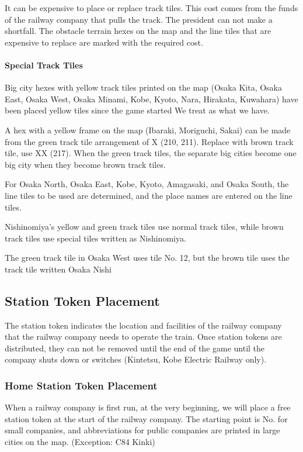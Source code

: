 \documentclass{article}
\begin{document}
\begin{CJK}{UTF8}{min}
It can be expensive to place or replace track tiles. This cost comes
from the funds of the railway company that pulls the track. The
president can not make a shortfall. The obstacle terrain hexes on the
map and the line tiles that are expensive to replace are marked with
the required cost.

\paragraph{Special Track Tiles}
Big city hexes with yellow track tiles printed on the map (Osaka Kita,
Osaka East, Osaka West, Osaka Minami, Kobe, Kyoto, Nara, Hirakata,
Kuwahara) have been placed yellow tiles since the game started We
treat as what we have.

A hex with a yellow frame on the map (Ibaraki, Moriguchi, Sakai) can
be made from the green track tile arrangement of X (210, 211). Replace
with brown track tile, use XX (217). When the green track tiles, the
separate big cities become one big city when they become brown track
tiles.

For Osaka North, Osaka East, Kobe, Kyoto, Amagasaki, and Osaka South,
the line tiles to be used are determined, and the place names are
entered on the line tiles.

Nishinomiya's yellow and green track tiles use normal track tiles,
while brown track tiles use special tiles written as Nishinomiya.

The green track tile in Osaka West uses tile No. 12, but the brown
tile uses the track tile written Osaka Nishi

\subsection{Station Token Placement}
The station token indicates the location and facilities of the railway
company that the railway company needs to operate the train. Once
station tokens are distributed, they can not be removed until the end
of the game until the company shuts down or switches (Kintetsu, Kobe
Electric Railway only).

\subsubsection{Home Station Token Placement}
When a railway company is first run, at the very beginning, we will
place a free station token at the start of the railway company. The
starting point is No. for small companies, and abbreviations for
public companies are printed in large cities on the map. (Exception:
C84 Kinki)


\end{CJK}
\end{document}
